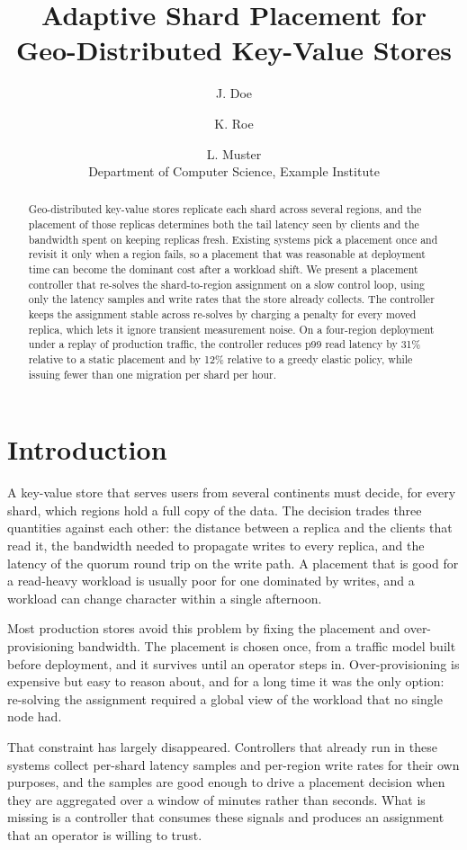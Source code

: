﻿\documentclass[10pt,twocolumn,letterpaper]{article}
\title{Adaptive Shard Placement for Geo-Distributed Key-Value Stores}
\author{J. Doe \and K. Roe \and L. Muster\\
Department of Computer Science, Example Institute}
\date{}
\begin{document}
\maketitle

\begin{abstract}
Geo-distributed key-value stores replicate each shard across several regions, and the
placement of those replicas determines both the tail latency seen by clients and the
bandwidth spent on keeping replicas fresh. Existing systems pick a placement once and
revisit it only when a region fails, so a placement that was reasonable at deployment
time can become the dominant cost after a workload shift. We present a placement
controller that re-solves the shard-to-region assignment on a slow control loop, using
only the latency samples and write rates that the store already collects. The controller
keeps the assignment stable across re-solves by charging a penalty for every moved
replica, which lets it ignore transient measurement noise. On a four-region deployment
under a replay of production traffic, the controller reduces p99 read latency by 31\%
relative to a static placement and by 12\% relative to a greedy elastic policy, while
issuing fewer than one migration per shard per hour.
\end{abstract}

\section{Introduction}
A key-value store that serves users from several continents must decide, for every
shard, which regions hold a full copy of the data. The decision trades three quantities
against each other: the distance between a replica and the clients that read it, the
bandwidth needed to propagate writes to every replica, and the latency of the quorum
round trip on the write path. A placement that is good for a read-heavy workload is
usually poor for one dominated by writes, and a workload can change character within a
single afternoon.

Most production stores avoid this problem by fixing the placement and over-provisioning
bandwidth. The placement is chosen once, from a traffic model built before deployment,
and it survives until an operator steps in. Over-provisioning is expensive but easy to
reason about, and for a long time it was the only option: re-solving the assignment
required a global view of the workload that no single node had.

That constraint has largely disappeared. Controllers that already run in these systems
collect per-shard latency samples and per-region write rates for their own purposes, and
the samples are good enough to drive a placement decision when they are aggregated over
a window of minutes rather than seconds. What is missing is a controller that consumes
these signals and produces an assignment that an operator is willing to trust.
\end{document}
